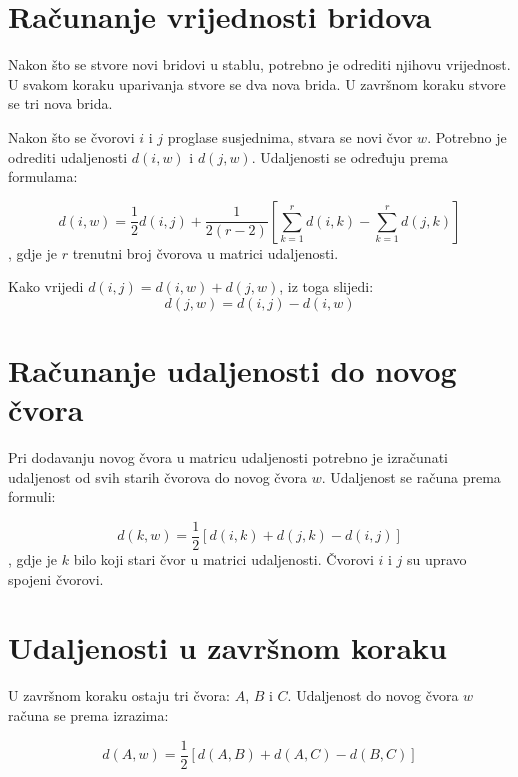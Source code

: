 \documentclass[times, utf8, seminar, numeric]{fer}
\begin{document}
\section{Računanje vrijednosti bridova}

Nakon što se stvore novi bridovi u stablu, potrebno je odrediti njihovu vrijednost. U svakom koraku uparivanja stvore se dva nova brida. U završnom koraku stvore se tri nova brida.

Nakon što se čvorovi $i$ i $j$ proglase susjednima, stvara se novi čvor $w$. Potrebno je odrediti udaljenosti $d(i, w)$ i $d(j,w)$. Udaljenosti se određuju prema formulama:

\begin{equation}
d(i,w) = \frac{1}{2}d(i,j)+\frac{1}{2(r-2)} \left [ \sum_{k=1}^{r}d(i,k) - \sum_{k=1}^{r}d(j,k) \right ]
\end{equation}
, gdje je $r$ trenutni broj čvorova u matrici udaljenosti.

Kako vrijedi $d(i,j)=d(i,w)+d(j,w)$, iz toga slijedi:
\begin{equation}
d(j,w) = d(i,j) - d(i,w)
\end{equation}

\section{Računanje udaljenosti do novog čvora}

Pri dodavanju novog čvora u matricu udaljenosti potrebno je izračunati udaljenost od svih starih čvorova do novog čvora $w$. Udaljenost se računa prema formuli: 

\begin{equation}
d(k,w) = \frac{1}{2} \left [ d(i,k) + d(j,k) - d(i,j) \right ]
\end{equation}
, gdje je $k$ bilo koji stari čvor u matrici udaljenosti. Čvorovi $i$ i $j$ su upravo spojeni čvorovi. 

\section{Udaljenosti u završnom koraku}

U završnom koraku ostaju tri čvora: $A$, $B$ i $C$. Udaljenost do novog čvora $w$ računa se prema izrazima:

\begin{equation}
d(A,w) = \frac{1}{2} \left [ d(A,B) + d(A,C) - d(B,C) \right ]
\end{equation}
\end{document}
